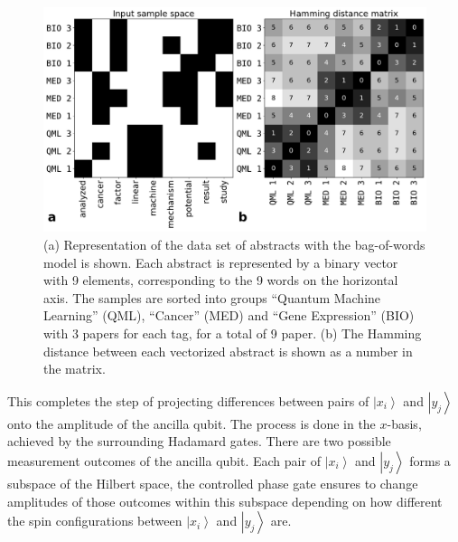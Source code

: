 \documentclass[pra,showkeys,twocolumn,showpacs,aps,10pt]{revtex4-2}
\begin{document}
\begin{figure}[t]
    \centering
  \includegraphics[width=1.85\columnwidth]{vectorized_sample.pdf}
  \caption{
    (a) Representation of the data set of abstracts with the bag-of-words \cite{weikang2016} model is shown.
    Each abstract is represented by a binary vector with 9 elements, corresponding to the 9 words on the horizontal axis.
    The samples are sorted into groups ``Quantum Machine Learning'' (QML), ``Cancer'' (MED) and ``Gene Expression'' (BIO) with 3 papers for each tag, for a total of 9 paper.
    (b) The Hamming distance between each vectorized abstract is shown as a number in the matrix.
  }
  \label{fig:vectorized_sample}
\end{figure}


This completes the step of projecting differences between pairs of $\left| x_i \right\rangle$ and $\left| y_j \right\rangle$ onto the amplitude of the ancilla qubit.
The process is done in the $x$-basis, achieved by the surrounding Hadamard gates.
There are two possible measurement outcomes of the ancilla qubit.
Each pair of $\left|x_i \right\rangle$ and $\left| y_j \right\rangle$ forms a subspace of the Hilbert space,
the controlled phase gate ensures to change amplitudes of those outcomes within this subspace depending on how different the spin configurations between $\left| x_i \right\rangle$ and $\left| y_j \right\rangle$ are.
\end{document}
